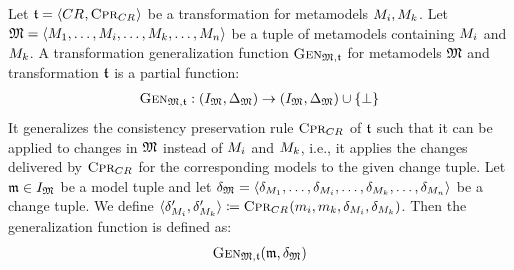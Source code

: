 \begin{definition}
    \label{def:generalizationfunction}
    Let $\mathfrak{t} = \langle CR_{}, \textsc{Cpr}_{CR_{}} \rangle$ be a transformation for metamodels $M_{i}, M_{k}$.
    Let $\mathfrak{M} = \langle M_{1}, \dots, M_{i}, \dots, M_{k}, \dots, M_{n} \rangle$ be a tuple of metamodels containing $M_{i}$ and $M_{k}$.
    A transformation generalization function $\textsc{Gen}_{\mathfrak{M},\mathfrak{t}}$ for metamodels $\mathfrak{M}$ and transformation $\mathfrak{t}$ is a partial function:
    \begin{align*}
        \textsc{Gen}_{\mathfrak{M},\mathfrak{t}} : (I_{\mathfrak{M}}, \Delta_{\mathfrak{M}}) \rightarrow (I_{\mathfrak{M}}, \Delta_{\mathfrak{M}}) \cup \{ \bot \}
    \end{align*}
    It generalizes the consistency preservation rule $\textsc{Cpr}_{CR_{}}$ of $\mathfrak{t}$ such that it can be applied to changes in $\mathfrak{M}$ instead of $M_{i}$ and $M_{k}$, i.e., it applies the changes delivered by $\textsc{Cpr}_{CR_{}}$ for the corresponding models to the given change tuple.
    Let $\mathfrak{m} \in I_{\mathfrak{M}}$ be a model tuple and let $\mathfrak{\delta}_{\mathfrak{M}} = \langle \delta_{M_{1}}, \dots, \delta_{M_{i}}, \dots, \delta_{M_{k}}, \dots, \delta_{M_{n}} \rangle$ be a change tuple.
    We define $\langle \delta_{M_{i}}', \delta_{M_{k}}' \rangle \coloneqq \textsc{Cpr}_{CR_{}}(m_{i}, m_{k}, \delta_{M_{i}}, \delta_{M_{k}})$.
    Then the generalization function is defined as:
    \begin{align*}
        &
        \generalizationfunction{\metamodeltuple{M},\transformation{t}}(\modeltuple{m}, \changetuple{\metamodeltuple{M}}) \\

\end{align*}
\end{definition}
